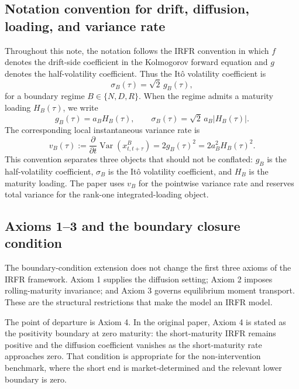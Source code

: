\documentclass[11pt]{article}
\newcommand{\Var}{\operatorname{Var}}
\numberwithin{equation}{section}
\begin{document}
\subsection{Notation convention for drift, diffusion, loading, and variance rate}

Throughout this note, the notation follows the IRFR convention in which $f$ denotes the drift-side coefficient in the Kolmogorov forward equation and $g$ denotes the half-volatility coefficient. Thus the It\^o volatility coefficient is
\begin{equation}
\sigma_B(\tau)=\sqrt{2}\,g_B(\tau),
\end{equation}
for a boundary regime $B\in\{N,D,R\}$. When the regime admits a maturity loading $H_B(\tau)$, we write
\begin{equation}
g_B(\tau)=a_BH_B(\tau),
\qquad
\sigma_B(\tau)=\sqrt{2}\,a_B|H_B(\tau)|.
\end{equation}
The corresponding local instantaneous variance rate is
\begin{equation}
v_B(\tau)
:=\frac{\partial}{\partial t}\Var(x^B_{t,t+\tau})
=2g_B(\tau)^2
=2a_B^2H_B(\tau)^2.
\end{equation}
This convention separates three objects that should not be conflated: $g_B$ is the half-volatility coefficient, $\sigma_B$ is the It\^o volatility coefficient, and $H_B$ is the maturity loading. The paper uses $v_B$ for the pointwise variance rate and reserves total variance for the rank-one integrated-loading object.

\subsection{Axioms 1--3 and the boundary closure condition}

The boundary-condition extension does not change the first three axioms of the IRFR framework. Axiom 1 supplies the diffusion setting; Axiom 2 imposes rolling-maturity invariance; and Axiom 3 governs equilibrium moment transport. These are the structural restrictions that make the model an IRFR model.

The point of departure is Axiom 4. In the original paper, Axiom 4 is stated as the positivity boundary at zero maturity: the short-maturity IRFR remains positive and the diffusion coefficient vanishes as the short-maturity rate approaches zero. That condition is appropriate for the non-intervention benchmark, where the short end is market-determined and the relevant lower boundary is zero.
\end{document}
